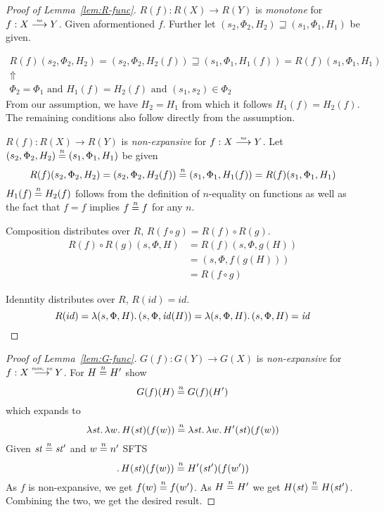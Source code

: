 \documentclass{article}
\newcommand{\monnefun}{\stackrel{\textit{\tiny{mon, ne}}}{\longrightarrow}}
\newcommand{\nefun}{\stackrel{\textit{\tiny{ne}}}{\longrightarrow}}
\newcommand{\nequal}[1][n]{\stackrel{\tiny{#1}}{=}}
\newcommand{\id}{\var{id}}
\newcommand{\var}[1]{\mathit{#1}}
\newcommand{\future}{\mathbin{\sqsupseteq}}
\begin{document}
\begin{proof}[Proof of Lemma~\ref{lem:R-func}]
   $R(f) : R(X) \rightarrow R(Y)$ is \emph{monotone} for $f : X \nefun Y$. Given aformentioned $f$. Further let $(s_2,\Phi_2,H_2) \future (s_1,\Phi_1,H_1)$ be given. 

    \begin{gather*}
      R(f)(s_2,\Phi_2,H_2) = (s_2,\Phi_2,H_2(f)) \future (s_1,\Phi_1,H_1(f)) = R(f)(s_1,\Phi_1,H_1) \\
      \Uparrow\\
      \Phi_2 = \Phi_1 \text{ and } H_1(f) = H_2(f) \text{ and } (s_1,s_2) \in \Phi_2
    \end{gather*}
    From our assumption, we have $H_2 = H_1$ from which it follows $H_1(f) = H_2(f)$. The remaining conditions also follow directly from the assumption.

    $R(f) : R(X) \rightarrow R(Y)$ is \emph{non-expansive} for $f : X \nefun Y$. Let $(s_2,\Phi_2,H_2) \nequal (s_1,\Phi_1,H_1)$ be given
\[
  R(f)(s_2,\Phi_2,H_2) = (s_2,\Phi_2,H_2(f)) \nequal (s_1,\Phi_1,H_1(f)) = R(f)(s_1,\Phi_1,H_1)
\]
$H_1(f) \nequal H_2(f)$ follows from the definition of $n$-equality on functions as well as the fact that $f=f$ implies $f \nequal f$ for any $n$.

  Composition distributes over $R$, $R(f \circ g) = R(f) \circ R(g)$.
  \begin{align*}
    R(f) \circ R(g)(s,\Phi,H) &= R(f)(s,\Phi,g(H)) \\
                              &= (s,\Phi,f(g(H)))\\
                              &= R(f \circ g)
  \end{align*}

  Idenntity distributes over $R$, $R(\id) = \id$.
  \[
    R(id) = \lambda (s,\Phi,H) \ldotp  (s,\Phi,\id(H)) = \lambda (s,\Phi,H) \ldotp  (s,\Phi,H) = \id
  \]
\end{proof}

\begin{proof}[Proof of Lemma~\ref{lem:G-func}]
  $G(f) : G(Y) \rightarrow G(X)$ is \emph{non-expansive} for $f : X \monnefun Y$. For $H \nequal H'$ show
  \[
    G(f)(H) \nequal G(f)(H')
  \]
  which expands to
  \[
    \lambda \var{st} \ldotp \lambda w \ldotp H(\var{st})(f(w)) \nequal \lambda \var{st} \ldotp \lambda w \ldotp  H'(\var{st})(f(w))
  \]
  Given $\var{st} \nequal \var{st}'$ and $w \nequal n'$ SFTS
  \[
  \ldotp H(\var{st})(f(w)) \nequal H'(\var{st}')(f(w'))
  \]
  As $f$ is non-expansive, we get $f(w) \nequal f(w')$. As $H \nequal H'$ we get $H(\var{st}) \nequal H(\var{st'})$. Combining the two, we get the desired result.  
\end{proof}
\end{document}

